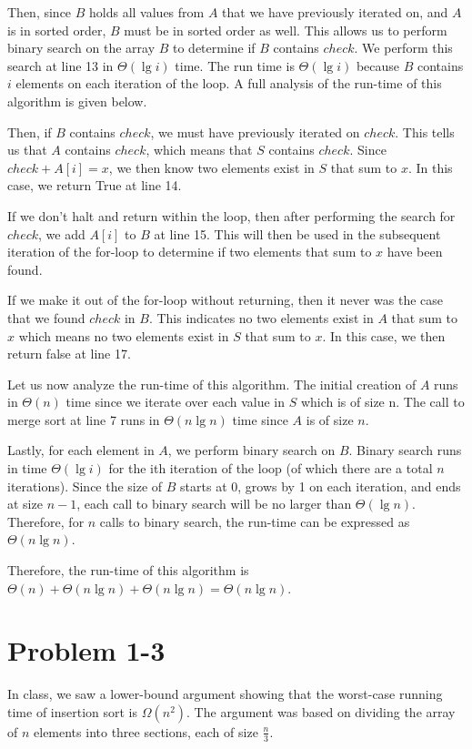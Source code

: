 \documentclass[11pt]{article}
\begin{document}
Then, since $B$ holds all values from $A$ that we have previously iterated on, and $A$ is in sorted order, $B$ must be in sorted order as well. This allows us to perform binary search on the array $B$ to determine if $B$ contains $check$. We perform this search at line 13 in $\Theta(\lg{i})$ time. The run time is $\Theta(\lg{i})$ because $B$ contains $i$ elements on each iteration of the loop. A full analysis of the run-time of this algorithm is given below.

 Then, if $B$ contains $check$, we must have previously iterated on $check$. This tells us that $A$ contains $check$, which means that $S$ contains $check$. Since $check + A[i] = x$, we then know two elements exist in $S$ that sum to $x$. In this case, we return True at line 14.

If we don't halt and return within the loop, then after performing the search for $check$, we add $A[i]$ to $B$ at line 15. This will then be used in the subsequent iteration of the for-loop to determine if two elements that sum to $x$ have been found.

If we make it out of the for-loop without returning, then it never was the case that we found $check$ in $B$. This indicates no two elements exist in $A$ that sum to $x$ which means no two elements exist in $S$ that sum to $x$. In this case, we then return false at line 17.

Let us now analyze the run-time of this algorithm. The initial creation of $A$ runs in $\Theta(n)$ time since we iterate over each value in $S$ which is of size n. The call to merge sort at line 7 runs in $\Theta(n\lg{n})$ time since $A$ is of size $n$.

Lastly, for each element in $A$, we perform binary search on $B$. Binary search runs in time $\Theta(\lg{i})$ for the ith iteration of the loop (of which there are a total $n$ iterations). Since the size of $B$ starts at 0, grows by 1 on each iteration, and ends at size $n-1$, each call to binary search will be no larger than $\Theta(\lg{n})$. Therefore, for $n$ calls to binary search, the run-time can be expressed as $\Theta(n\lg{n})$.

Therefore, the run-time of this algorithm is $\Theta(n) + \Theta(n\lg{n}) + \Theta(n\lg{n}) = \Theta(n\lg{n})$.

\newpage

\section{Problem 1-3}
In class, we saw a lower-bound argument showing that the worst-case running time of insertion sort is $\Omega(n^2)$. The argument was based on dividing the array of $n$ elements into three sections, each of size $\frac{n}{3}$.
\end{document}
